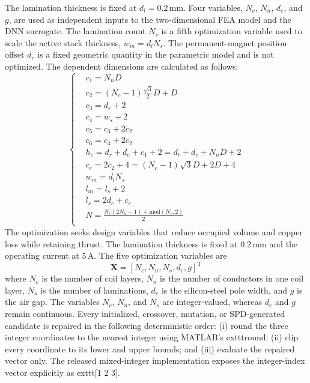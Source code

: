 The lamination thickness is fixed at $d_l=0.2\,\mathrm{mm}$. Four variables, $N_c$, $N_n$, $d_e$, and $g$, are used as independent inputs to the two-dimensional FEA model and the DNN surrogate. The lamination count $N_s$ is a fifth optimization variable used to scale the active stack thickness, $w_m=d_lN_s$. The permanent-magnet position offset $d_r$ is a fixed geometric quantity in the parametric model and is not optimized. The dependent dimensions are calculated as follows:
\begin{equation}\label{functional relationships}
	\left\{
	\begin{aligned}
		&c_1=N_nD \\
		&c_2=(N_c-1)\frac{\sqrt{3}}{2}D+D \\
		&c_3=d_e+2\\
		&c_4=w_s+2\\
		&c_5=c_3+2c_2\\
		&c_6=c_4+2c_2\\
		&h_e=d_r+d_e+c_1+2=d_r+d_e+N_nD+2\\
		&c_e=2c_2+4=(N_c-1)\sqrt{3}D+2D+4\\
		&w_m=d_lN_s\\
		&l_m=l_s+2\\
		&l_s=2d_e+c_e\\
		&N=\frac{N_c(2N_n-1)+\mathrm{mod}(N_c,2)}{2}\\
	\end{aligned}
	\right.
\end{equation}
The optimization seeks design variables that reduce occupied volume and copper loss while retaining thrust. The lamination thickness is fixed at $0.2\,\mathrm{mm}$ and the operating current at $5\,\mathrm{A}$. The five optimization variables are
\begin{equation}
	\bm{X}=[N_c, N_n, N_s, d_e, g]^{\text{T}}
\end{equation}
where $N_c$ is the number of coil layers, $N_n$ is the number of conductors in one coil layer, $N_s$ is the number of laminations, $d_e$ is the silicon-steel pole width, and $g$ is the air gap. The variables $N_c$, $N_n$, and $N_s$ are integer-valued, whereas $d_e$ and $g$ remain continuous. Every initialized, crossover, mutation, or SPD-generated candidate is repaired in the following deterministic order: (i) round the three integer coordinates to the nearest integer using MATLAB's 	exttt{round}; (ii) clip every coordinate to its lower and upper bounds; and (iii) evaluate the repaired vector only. The released mixed-integer implementation exposes the integer-index vector explicitly as 	exttt{[1 2 3]}.
